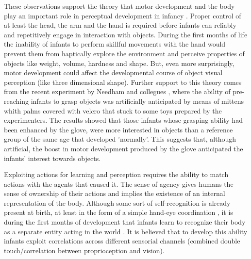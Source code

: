 These observations support the theory that motor development and the body play an important role in perceptual development in infancy \cite{bushnell93motor}. Proper control of at least the head, the arm and the hand is required before infants can reliably and repetitively engage in interaction with objects. During the first months of life the inability of infants to perform skillful movements with the hand would prevent them from haptically explore the environment and perceive properties of objects like weight, volume, hardness and shape. But, even more surprisingly, motor development could affect the developmental course of object visual perception (like three dimensional shape).
Further support to this theory comes from the recent experiment by Needham and collegues \cite{Needham02apick-me-up}, where the ability of pre-reaching infants to grasp objects was artificially anticipated by means of mittens whith palms covered with velcro that stuck to some toys prepared by the experimenters. The results showed that those infants whose grasping ability had been enhanced by the glove, were more interested in objects than a reference group of the same age that developed 'normally'. This suggests that, although artificial, the boost in motor development produced by the glove anticipated the infants' interest towards objects.

Exploiting actions for learning and perception requires the ability to match actions with the agents that caused it. The sense of agency \cite{jeannerod02mechanism} gives humans the sense of ownership of their actions and implies the existence of an internal representation of the body. Although some sort of self-recognition is already present at birth, at least in the form of a simple hand-eye coordination \cite{meer95thefunctional}, it is during the first months of development that infants learn to recognize their body as a separate entity acting in the world \cite{rochat00perceived}. It is believed that to develop this ability infants exploit correlations across different sensorial channels (combined double touch/correlation between proprioception and vision). %

